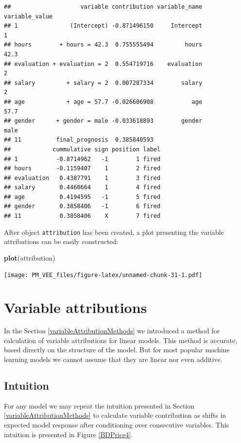 \documentclass[]{krantz}
\newenvironment{Shaded}{\begin{snugshade}}{\end{snugshade}}
\newcommand{\KeywordTok}[1]{\textcolor[rgb]{0.13,0.29,0.53}{\textbf{#1}}}
\newcommand{\NormalTok}[1]{#1}
\theoremstyle{definition}
\theoremstyle{definition}
\theoremstyle{definition}
\theoremstyle{remark}
\begin{document}
\begin{verbatim}
##                    variable contribution variable_name variable_value
## 1               (Intercept) -0.871496150     Intercept              1
## hours        + hours = 42.3  0.755555494         hours           42.3
## evaluation + evaluation = 2  0.554719716    evaluation              2
## salary         + salary = 2  0.007287334        salary              2
## age            + age = 57.7 -0.026606908           age           57.7
## gender      + gender = male -0.033618893        gender           male
## 11          final_prognosis  0.385840593                             
##            cummulative sign position label
## 1           -0.8714962   -1        1 fired
## hours       -0.1159407    1        2 fired
## evaluation   0.4387791    1        3 fired
## salary       0.4460664    1        4 fired
## age          0.4194595   -1        5 fired
## gender       0.3858406   -1        6 fired
## 11           0.3858406    X        7 fired
\end{verbatim}

After object \texttt{attribution} has been created, a plot presenting
the variable attributions can be easily constructed:

\begin{Shaded}
\begin{Highlighting}[]
\KeywordTok{plot}\NormalTok{(attribution)}
\end{Highlighting}
\end{Shaded}

\texttt{[image: PM\_VEE\_files/figure-latex/unnamed-chunk-31-1.pdf]}

\hypertarget{breakDown}{%
\section{Variable attributions}\label{breakDown}}

In the Section \ref{variableAttributionMethods} we introduced a method
for calculation of variable attributions for linear models. This method
is accurate, based directly on the structure of the model. But for most
popular machine learning models we cannot assume that they are linear
nor even additive.

\hypertarget{intuition-2}{%
\subsection{Intuition}\label{intuition-2}}

For any model we may repeat the intuition presented in Section
\ref{variableAttributionMethods} to calculate variable contribution as
shifts in expected model response after conditioning over consecutive
variables. This intuition is presented in Figure \ref{BDPrice4}.
\end{document}
